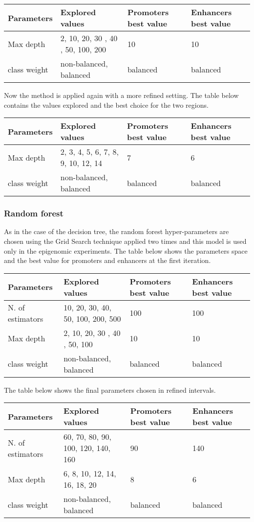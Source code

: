 \begin{longtable}[]{@{}llll@{}}
\toprule
\textbf{Parameters} & \textbf{Explored values} & \textbf{Promoters best value} & \textbf{Enhancers best value}\tabularnewline
\midrule
\endhead
Max depth & 2, 10, 20, 30 , 40 , 50, 100, 200 & 10 & 10\tabularnewline
class weight & non-balanced, balanced & balanced &
balanced\tabularnewline
\bottomrule
\end{longtable}

Now the method is applied again with a more refined setting. The table
below contains the values explored and the best choice for the two
regions.

\begin{longtable}[]{@{}llll@{}}
\toprule
\textbf{Parameters} & \textbf{Explored values} & \textbf{Promoters best value} & \textbf{Enhancers best value}\tabularnewline
\midrule
\endhead
Max depth & 2, 3, 4, 5, 6, 7, 8, 9, 10, 12, 14 & 7 & 6\tabularnewline
class weight & non-balanced, balanced & balanced &
balanced\tabularnewline
\bottomrule
\end{longtable}

\subsubsection{Random forest}\label{header-n775}

As in the case of the decision tree, the random forest hyper-parameters
are chosen using the Grid Search technique applied two times and this
model is used only in the epigenomic experiments. The table below shows
the parameters space and the best value for promoters and enhancers at
the first iteration.

\begin{longtable}[]{@{}llll@{}}
\toprule
\textbf{Parameters} & \textbf{Explored values} & \textbf{Promoters best value} & \textbf{Enhancers best value}\tabularnewline
\midrule
\endhead
N. of estimators & 10, 20, 30, 40, 50, 100, 200, 500 & 100 &
100\tabularnewline
Max depth & 2, 10, 20, 30 , 40 , 50, 100 & 10 & 10\tabularnewline
class weight & non-balanced, balanced & balanced &
balanced\tabularnewline
\bottomrule
\end{longtable}

The table below shows the final parameters chosen in refined intervals.

\begin{longtable}[]{@{}llll@{}}
\toprule
\textbf{Parameters} & \textbf{Explored values} & \textbf{Promoters best value} & \textbf{Enhancers best value}\tabularnewline
\midrule
\endhead
N. of estimators & 60, 70, 80, 90, 100, 120, 140, 160 & 90 &
140\tabularnewline
Max depth & 6, 8, 10, 12, 14, 16, 18, 20 & 8 & 6\tabularnewline
class weight & non-balanced, balanced & balanced &
balanced\tabularnewline
\bottomrule
\end{longtable}

